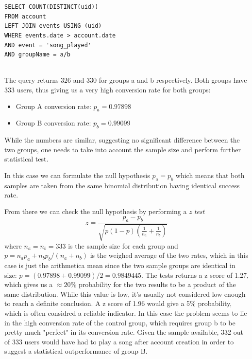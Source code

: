 \documentclass[paper=a4, fontsize=11pt]{report}
\begin{document}
\begin{lstlisting}[frame=single,caption=Return conversion rates \label{code:sql_average_fixed_table}]


SELECT COUNT(DISTINCT(uid)) 
FROM account 
LEFT JOIN events USING (uid)
WHERE events.date > account.date
AND event = 'song_played'
AND groupName = a/b
   
\end{lstlisting}
The query returns 326 and 330 for groups a and b respectively. Both groups have 333 users, thus giving us a very high conversion rate for both groups:
\begin{itemize}
 \item Group A conversion rate: $p_{a} = 0.97898$
 \item Group B conversion rate: $p_{b} = 0.99099$
\end{itemize}


While the numbers are similar, suggesting no significant difference between the two groups, one needs to take into account the sample size and perform
further statistical test.


In this case we can formulate the null hypothesis $p_{a} = p_{b}$ which means that both samples are taken from the same binomial distribution having identical
success rate.


From there we can check the null hypothesis by performing a \textit{z test}
\begin{equation}
 z = \frac{p_{a}-p_{b}}{\sqrt{p(1-p)(\frac{1}{n_{a}} + \frac{1}{n_{b}})}}
\end{equation}
where $n_{a} = n_{b} = 333 $ is the sample size for each group and $ p = n_{a}p_{a} + n_{b}p_{b}/ (n_{a} + n_{b})$ is the weighed average of the two rates,
which in this case is just the arithmetica mean since the two sample groups are identical in size: $p = (0.97898 + 0.99099)/2 = 0.9849445
$. The tests returns a z score of 1.27, which gives us a $\approx 20\%$ probability for the two results to be a product of the 
same distribution.
While this value is low, it's usually not considered low enough to reach a definite conclusion. A z score of 1.96 would give a 5$\%$ probability,
which is often considred a reliable indicator. In this case the problem seems to lie in the high conversion rate of the control group,
which requires group b to be pretty much "perfect" in its conversion rate. Given the sample available, 332 out of 333
users would have had to play a song after account creation in order to suggest a statistical outperformance of group B. 
\end{document}
